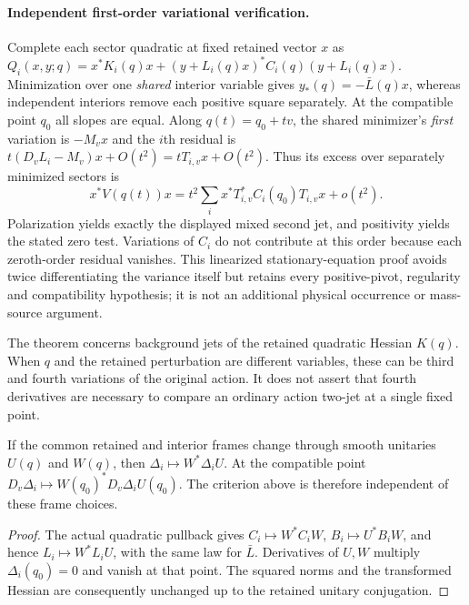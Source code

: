 \documentclass[12pt,a4paper]{article}
\begin{document}
\paragraph{Independent first-order variational verification.}
Complete each sector quadratic at fixed retained vector $x$ as
$Q_i(x,y;q)=x^*K_i(q)x+(y+L_i(q)x)^*C_i(q)(y+L_i(q)x)$.
Minimization over one \emph{shared} interior variable gives
$y_*(q)=-\bar L(q)x$, whereas independent interiors remove each
positive square separately.  At the compatible point $q_0$ all slopes
are equal.  Along $q(t)=q_0+tv$, the shared minimizer's \emph{first}
variation is $-M_vx$ and the $i$th residual is
$t(D_vL_i-M_v)x+O(t^2)=tT_{i,v}x+O(t^2)$.
Thus its excess over separately minimized sectors is
\[
 x^*V(q(t))x=t^2\sum_i x^*T_{i,v}^*C_i(q_0)T_{i,v}x+o(t^2).
\]
Polarization yields exactly the displayed mixed second jet, and
positivity yields the stated zero test.  Variations of $C_i$ do not
contribute at this order because each zeroth-order residual vanishes.
This linearized stationary-equation proof avoids twice differentiating
the variance itself but retains every positive-pivot, regularity and
compatibility hypothesis; it is not an additional physical occurrence
or mass-source argument.

The theorem concerns background jets of the retained quadratic Hessian
$K(q)$.  When $q$ and the retained perturbation are different variables,
these can be third and fourth variations of the original action.  It
does not assert that fourth derivatives are necessary to compare an
ordinary action two-jet at a single fixed point.

\begin{corollary}
\label{paper3a:corollary:atlas-frame-covariance-of-the-second-jet-defect-220dfda}

If the common retained and interior frames change through smooth
unitaries $U(q)$ and $W(q)$, then
$\Delta_i\mapsto W^*\Delta_iU$.  At the compatible point
$D_v\Delta_i\mapsto W(q_0)^*D_v\Delta_iU(q_0)$.
The criterion above is therefore independent of these frame choices.
\end{corollary}
\begin{proof}
The actual quadratic pullback gives
$C_i\mapsto W^*C_iW$, $B_i\mapsto U^*B_iW$, and hence
$L_i\mapsto W^*L_iU$, with the same law for $\bar L$.
Derivatives of $U,W$ multiply $\Delta_i(q_0)=0$ and vanish at that
point.  The squared norms and the transformed Hessian are consequently
unchanged up to the retained unitary conjugation.
\end{proof}
\end{document}
